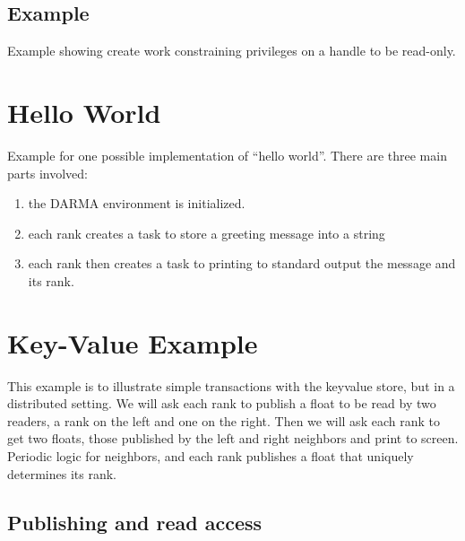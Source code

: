 \subsection{Example}
Example showing create work constraining privileges on a handle to be read-only.






\section{Hello World}

Example for one possible implementation of ``hello world''. 
There are three main parts involved: 
\begin{enumerate}
\item the DARMA environment is initialized. 
\item each rank creates a task to store a greeting message into a string
\item each rank then creates a task to printing to standard output the message and its rank.
\end{enumerate}






\section{Key-Value Example}

This example is to illustrate simple transactions with the keyvalue store, 
but in a distributed setting. We will ask each rank to publish a float to be
read by two readers, a rank on the left and one on the right. Then we will ask
each rank to get two floats, those published by the left and right neighbors
and print to screen. Periodic logic for neighbors, and each rank publishes a 
float that uniquely determines its rank.









\subsection{Publishing and read access}

